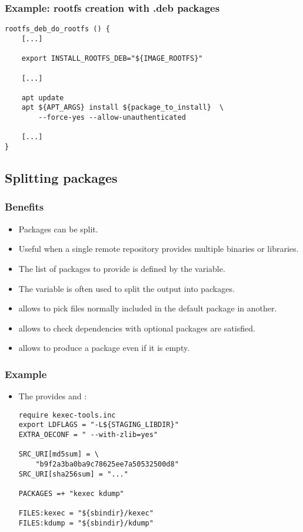 \begin{frame}[fragile]
  \frametitle{Example: rootfs creation with .deb packages}
  \begin{block}{}
    \begin{verbatim}
rootfs_deb_do_rootfs () {
    [...]

    export INSTALL_ROOTFS_DEB="${IMAGE_ROOTFS}"

    [...]

    apt update
    apt ${APT_ARGS} install ${package_to_install}  \
        --force-yes --allow-unauthenticated

    [...]
}
    \end{verbatim}
  \end{block}
\end{frame}

\subsection{Splitting packages}

\begin{frame}
  \frametitle{Benefits}
  \begin{itemize}
    \item Packages can be split.
    \item Useful when a single remote repository provides multiple
      binaries or libraries.
    \item The list of packages to provide is defined by the
       variable.
    \item The  variable is often used to split the output
      into packages.
    \item {} allows to pick files normally included in the
      default package in another.
    \item {} allows to check dependencies with optional
      packages are satisfied.
    \item {} allows to produce a package even if it is empty.
  \end{itemize}
\end{frame}

\begin{frame}[fragile]
  \frametitle{Example}
  \begin{itemize}
    \item The  provides  and :
    \begin{block}{}
    \begin{verbatim}
require kexec-tools.inc
export LDFLAGS = "-L${STAGING_LIBDIR}"
EXTRA_OECONF = " --with-zlib=yes"

SRC_URI[md5sum] = \
    "b9f2a3ba0ba9c78625ee7a50532500d8"
SRC_URI[sha256sum] = "..."

PACKAGES =+ "kexec kdump"

FILES:kexec = "${sbindir}/kexec"
FILES:kdump = "${sbindir}/kdump"
    \end{verbatim}
    \end{block}
  \end{itemize}
\end{frame}

